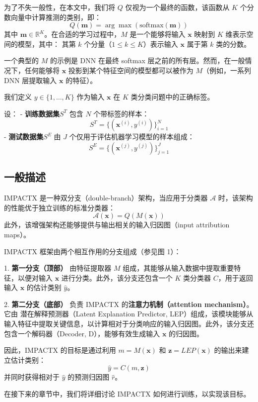 \documentclass[12pt, a4paper]{ctexart} %
\begin{document}
为了不失一般性，在本文中，我们将 \( Q \) 仅视为一个最终的函数，该函数从 \( K \) 个分数向量中计算推测的类别，即：
\[
Q(\mathbf{m}) = \arg\max (\text{softmax}(\mathbf{m}))
\]
其中 \( \mathbf{m} \in \mathbb{R}^{K} \)。在合适的学习过程中，\( M \) 是一个能够将输入 \( \mathbf{x} \) 映射到 \( K \) 维表示空间的模型，其中：
 其第 \( k \) 个分量（\( 1 \leq k \leq K \)）表示输入 \( \mathbf{x} \) 属于第 \( k \) 类的分数。

一个典型的 \( M \) 的示例是 DNN 在最终 softmax 层之前的所有层。然而，在一般情况下，任何能够将 \( \mathbf{x} \) 投影到某个特征空间的模型都可以被作为 \( M \)（例如，一系列 DNN 层提取输入 \( \mathbf{x} \) 的特征）。

我们定义 \( y \in \{1, \dots, K\} \) 作为输入 \( \mathbf{x} \) 在 \( K \) 类分类问题中的正确标签。

设：
- \textbf{训练数据集}\( S^T \) 包含 \( N \) 个带标签的样本：
  \[
  S^T = \{ (\mathbf{x}^{(i)}, y^{(i)}) \}_{i=1}^{N}
  \]
- \textbf{测试数据集}\( S^E \) 由 \( J \) 个仅用于评估机器学习模型的样本组成：
  \[
  S^E = \{ (\mathbf{x}^{(j)}, y^{(j)}) \}_{j=1}^{J}
  \]
\subsection{一般描述}
IMPACTX 是一种双分支（double-branch）架构，当应用于分类器 \( \mathcal{A} \) 时，该架构的性能优于独立训练的标准分类器：
\[
\mathcal{A}(\mathbf{x}) = Q(M(\mathbf{x}))
\]
此外，该增强架构还能够提供与输出相关的输入归因图（input attribution maps）。

IMPACTX 框架由两个相互作用的分支组成（参见图 1）：

1. \textbf{第一分支（顶部）} 由特征提取器 \( M \) 组成，其能够从输入数据中提取重要特征，以便对输入 \( \mathbf{x} \) 进行分类。此外，该分支还包含一个 \( K \) 类分类器 \( C \)，用于返回输入 \( \mathbf{x} \) 的估计类别 \( \hat{y} \)。

2. \textbf{第二分支（底部）} 负责 IMPACTX 的\textbf{注意力机制（attention mechanism）}。它由 潜在解释预测器（Latent Explanation Predictor, LEP）组成，该模块能够从输入特征中提取关键信息，以计算相对于分类响应的输入归因图。此外，该分支还包含一个解码器（Decoder, D），能够有效生成输入 \( \mathbf{x} \) 的归因图。

因此，IMPACTX 的目标是通过利用 \( m = M(\mathbf{x}) \) 和 \( \mathbf{z} = LEP(\mathbf{x}) \) 的输出来建立估计类别：
\[
\hat{y} = C(m, \mathbf{z})
\]
并同时获得相对于 \( \hat{y} \) 的预测归因图 \( \hat{r} \)。

在接下来的章节中，我们将详细讨论 IMPACTX 如何进行训练，以实现该目标。
\end{document}
